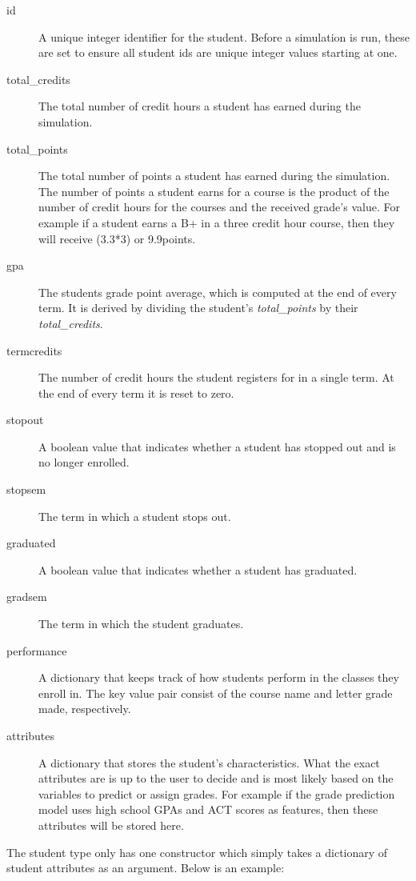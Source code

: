 \documentclass[botnum, fleqn]{unmeethesis}
\begin{document}
      \begin{description}
        \item [id] A unique integer identifier for the student. Before a simulation is run, these are set to ensure all student ids are unique integer values starting at one.
        \item [total\_credits] The total number of credit hours a student has earned during the simulation.
        \item [total\_points] The total number of points a student has earned during the simulation. The number of points a student earns for a course is the product of the number of credit hours for the courses and the received grade's value. For example if a student earns a B+ in a three credit hour course, then they will receive (3.3*3) or 9.9points.
        \item [gpa] The students grade point average, which is computed at the end of every term. It is derived by dividing the student's \textit{total\_points} by their \textit{total\_credits}.
        \item [termcredits] The number of credit hours the student registers for in a single term. At the end of every term it is reset to zero.
        \item [stopout] A boolean value that indicates whether a student has stopped out and is no longer enrolled.
        \item [stopsem] The term in which a student stops out.
        \item [graduated] A boolean value that indicates whether a student has graduated.
        \item [gradsem] The term in which the student graduates.
        \item [performance] A dictionary that keeps track of how students perform in the classes they enroll in. The key value pair consist of the course name and letter grade made, respectively.
        \item [attributes] A dictionary that stores the student's characteristics. What the exact attributes are is up to the user to decide and is most likely based on the variables to predict or assign grades. For example if the grade prediction model uses high school GPAs and ACT scores as features, then these attributes will be stored here.
      \end{description}

      The student type only has one constructor which simply takes a dictionary of student attributes as an argument. Below is an example:
\end{document}
